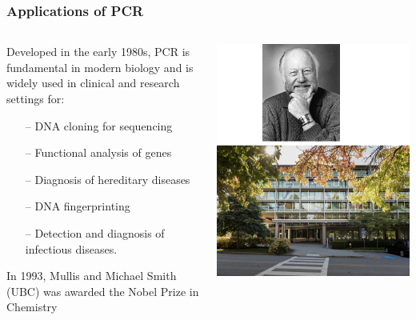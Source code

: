 \documentclass{beamer}
\begin{document}
\begin{frame}
	\frametitle{Applications of PCR}
	
	\begin{columns}
\begin{column}{0.5\textwidth}
Developed in the early 1980s, PCR is fundamental in modern biology and is widely used in clinical and research settings for:
			\begin{itemize}
\item[--] DNA cloning for sequencing
\item[--] Functional analysis of genes 
\item[--] Diagnosis of hereditary diseases
\item[--] DNA fingerprinting
\item[--] Detection and diagnosis of infectious diseases. 
\end{itemize}
In 1993, Mullis and Michael Smith (UBC) was awarded the Nobel Prize in Chemistry
		\end{column}			
\begin{column}{0.5\textwidth}
\centering \includegraphics[keepaspectratio, width  =\textwidth]{img/PCR_MichaelSmith} 
\end{column}
\end{columns}


\end{frame}
\end{document}
